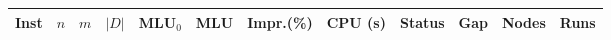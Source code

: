 \begin{tabular}{lrrrrrrrlrrr}
\hline
Inst & $n$ & $m$ & $|D|$ & MLU$_0$ & MLU & Impr.(\%) & CPU (s) & Status & Gap & Nodes & Runs \\\hline
\hline
\end{tabular}
